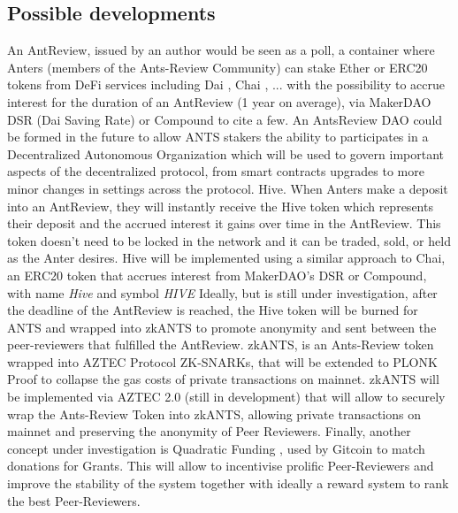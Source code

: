 \documentclass[runningheads]{llncs}
\begin{document}
\subsection{Possible developments}
An AntReview, issued by an author would be seen as a poll, a container where Anters (members of the Ants-Review Community) can stake Ether or ERC20 tokens from DeFi services including Dai \cite{Dai}, Chai \cite{Chai}, ... with the possibility to accrue interest for the duration of an AntReview (1 year on average), via MakerDAO DSR (Dai Saving Rate) \cite{DSR} or Compound \cite{Compound} to cite a few.
 An AntsReview DAO could be formed in the future to allow ANTS stakers the ability to participates in a Decentralized Autonomous Organization which will be used to govern important aspects of the decentralized protocol, from smart contracts upgrades to more minor changes in settings across the protocol.
\newline Hive. When Anters make a deposit into an AntReview, they will instantly receive the Hive token which represents their deposit and the accrued interest it gains over time in the AntReview.
\newline This token doesn't need to be locked in the network and it can be traded, sold, or held as the Anter desires.
\newline Hive will be implemented using a similar approach to Chai, an ERC20 token that accrues interest from MakerDAO's DSR or Compound, with name \emph{Hive} and symbol \emph{HIVE}
\newline Ideally, but is still under investigation, after the deadline of the AntReview is reached, the Hive token will be burned for ANTS and wrapped into zkANTS to promote anonymity and sent between the peer-reviewers that fulfilled the AntReview.
\newline zkANTS, is an Ants-Review token wrapped into AZTEC Protocol \cite{AZTEC} ZK-SNARKs, that will be extended to PLONK \cite{PLONK} Proof to collapse the gas costs of private transactions on mainnet.
\newline zkANTS will be implemented via AZTEC 2.0 (still in development) that will allow to securely wrap the Ants-Review Token into zkANTS, allowing private transactions on mainnet and preserving the anonymity of Peer Reviewers.
\newline Finally, another concept under investigation is Quadratic Funding \cite{LiberalRadicalism}, used by Gitcoin \cite{Gitcoin} to match donations for Grants. This will allow to incentivise prolific Peer-Reviewers and improve the stability of the system together with ideally a reward system to rank the best Peer-Reviewers.
\end{document}
